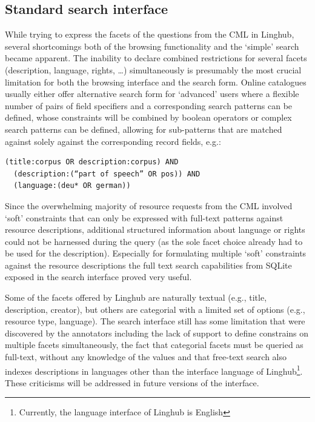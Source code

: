 \documentclass[smallextended]{svjour3}       %
\begin{document}
\subsection{Standard search interface}

While trying to express the facets of the questions from the CML in Linghub,
several shortcomings both of the browsing functionality and the `simple' search
became apparent. 
The inability to declare combined restrictions for several facets (description,
language, rights, \ldots) simultaneously is presumably the most crucial limitation
for both the browsing interface and the search form. Online catalogues usually
either offer alternative search form for `advanced' users where a flexible
number of pairs of field specifiers and a corresponding search patterns can be
defined, whose constraints will be combined by boolean operators or complex
search patterns can be defined, allowing for sub-patterns that are matched
against solely against the corresponding record fields, e.g.:

\begin{verbatim}
(title:corpus OR description:corpus) AND 
  (description:(“part of speech” OR pos)) AND 
  (language:(deu* OR german))
\end{verbatim}

Since the overwhelming majority of resource requests from the CML involved ‘soft’
constraints that can only be expressed with full-text patterns against resource
descriptions, additional structured information about language or rights could
not be harnessed during the query (as the sole facet choice already had to be
used for the description). Especially for formulating multiple ‘soft’
constraints against the resource descriptions the full text search capabilities
from SQLite exposed in the search interface proved very useful. 

Some of the facets offered by Linghub are naturally textual (e.g., title,
description, creator), but others are categorial with a limited set of
options (e.g., resource type, language). The search interface still has some
limitation that were discovered by the annotators including the lack of support
to define constrains on multiple facets simultaneously, the fact
that categorial facets must be queried as full-text, without any knowledge of
the values and that free-text search also indexes descriptions in languages
other than the interface language of Linghub\footnote{Currently, the language interface of Linghub is English}. These criticisms will be addressed in future versions of the interface.
\end{document}
